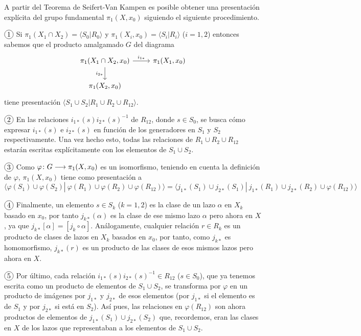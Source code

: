 \documentclass[GTSResumen.tex]{subfiles}
\begin{document}
A partir del Teorema de Seifert-Van Kampen es posible obtener una presentación explícita del grupo fundamental $\pi_1(X,x_0)$ siguiendo el siguiente procedimiento.

$\circled{1}$ Si $\pi_1(X_1\cap X_2)=\langle S_0|R_0\rangle$ y $\pi_1(X_i,x_0)=\langle S_i|R_i\rangle$ ($i=1,2$) entonces sabemos que el producto amalgamado $G$ del diagrama
\[
\begin{tikzcd}
\pi_1(X_1\cap X_2,x_0) \ar[r, "i_{1*}"]\arrow[d,"i_{2*} "'] & \pi_1(X_1,x_0)\\
\pi_1(X_2,x_0)
\end{tikzcd}
\]
tiene presentación $\langle S_1\cup S_2 | R_1\cup R_2\cup R_{12}\rangle$.

$\circled{2}$ En las relaciones $i_{1*}(s)i_{2*}(s)^{-1}$ de $R_{12}$, donde $s\in S_0$, se busca cómo expresar $i_{1*}(s)$ e $i_{2*}(s)$ en función de los generadores en $S_1$ y $S_2$ respectivamente. Una vez hecho esto, todas las relaciones de $R_1\cup R_2\cup R_{12}$ estarán escritas explícitamente con los elementos de $S_1\cup S_2$.

$\circled{3}$ Como $\varphi\colon{G}\longrightarrow{\pi_1(X,x_0)}$ es un isomorfismo, teniendo en cuenta la definición de $\varphi$, $\pi_1(X,x_0)$ tiene como presentación a
\[
\langle\varphi(S_1)\cup\varphi(S_2)|\ \varphi(R_1)\cup\varphi(R_2)\cup\varphi(R_{12})\rangle=\langle j_{1*}(S_1)\cup j_{2*}(S_1)|\ j_{1*}(R_1)\cup j_{2*}(R_2)\cup\varphi(R_{12})\rangle
\]

$\circled{4}$ Finalmente, un elemento $s\in S_k$ ($k=1,2$) es la clase de un lazo $\alpha$ en $X_k$ basado en $x_0$, por tanto $j_{k*}(\alpha)$ es la clase de ese mismo lazo $\alpha$ pero ahora en $X$, ya que  $j_{k*}[\alpha]=[j_k\circ\alpha]$. Análogamente, cualquier relación $r\in R_k$ es un producto de clases de lazos en $X_k$ basados en $x_0$, por tanto, como $j_{k*}$ es homomorfismo, $j_{k*}(r)$ es un producto de las clases de esos mismos lazos pero ahora en $X$.

$\circled{5}$ Por último, cada relación $i_{1*}(s)i_{2*}(s)^{-1}\in R_{12}$ ($s\in S_0$), que ya tenemos escrita como un producto de elementos de $S_1\cup S_2$, se transforma por $\varphi$ en un producto de imágenes por $j_{1*}$ y $j_{2*}$ de esos elementos (por $j_{1*}$ si el elemento es de $S_1$ y por $j_{2*}$ si está en $S_2$). Así pues, las relaciones en $\varphi(R_{12})$ son ahora productos de elementos de $j_{1*}(S_1)\cup j_{2*}(S_2)$ que, recordemos, eran las clases en $X$ de los lazos que representaban a los elementos de $S_1\cup S_2$.
\end{document}

